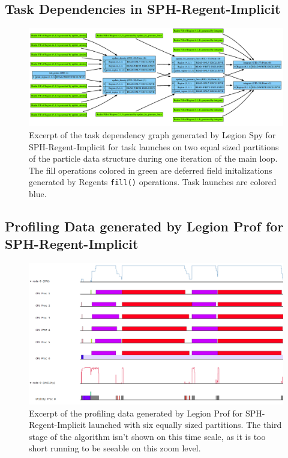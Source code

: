 \documentclass{article}      %
\begin{document}
\begin{appendices}
\begin{landscape}
		\end{landscape}

		\newpage

		\begin{landscape}
			\section{Task Dependencies in SPH-Regent-Implicit}
			\label{app:SPH-Regent-Implicit-SPY}
			\pagestyle{empty}%
			\begin{figure}[H]
				\includegraphics[width=0.95\linewidth]{images/SPH-Regent-Implicit_SPY}
				\caption*{Excerpt of the task dependency graph generated by Legion Spy for SPH-Regent-Implicit for task launches on two equal sized partitions of the particle data structure during one iteration of the main loop. The fill operations colored in green are deferred field initalizations generated by Regents \lstinline{fill()} operations. Task launches are colored blue.}
			\end{figure}
		\end{landscape}
		\newpage
		\begin{landscape}
			\section{Profiling Data generated by Legion Prof for SPH-Regent-Implicit}
			\label{app:SPH-Regent-Implicit-Prof}
			\pagestyle{empty}%

			\begin{figure}[H]
				\includegraphics[width=0.88\linewidth]{images/SPH-Regent-Implicit-Prof}
				\caption*{Excerpt of the profiling data generated by Legion Prof for SPH-Regent-Implicit launched with six equally sized partitions. The third stage of the algorithm isn't shown on this time scale, as it is too short running to be seeable on this zoom level. }
			\end{figure}

		\end{landscape}

\end{appendices}

\end{document}
